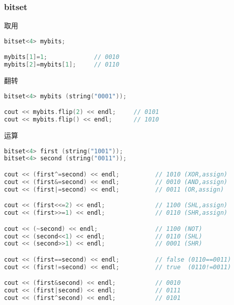     \subsubsection{bitset}
	取用\\
	\begin{lstlisting}[language=c++]
bitset<4> mybits;

mybits[1]=1;             // 0010
mybits[2]=mybits[1];     // 0110
	\end{lstlisting}
	翻转\\
	\begin{lstlisting}[language=c++]
bitset<4> mybits (string("0001"));

cout << mybits.flip(2) << endl;     // 0101
cout << mybits.flip() << endl;      // 1010
	\end{lstlisting}
	运算\\
	\begin{lstlisting}[language=c++]
bitset<4> first (string("1001"));
bitset<4> second (string("0011"));

cout << (first^=second) << endl;          // 1010 (XOR,assign)
cout << (first&=second) << endl;          // 0010 (AND,assign)
cout << (first|=second) << endl;          // 0011 (OR,assign)

cout << (first<<=2) << endl;              // 1100 (SHL,assign)
cout << (first>>=1) << endl;              // 0110 (SHR,assign)

cout << (~second) << endl;                // 1100 (NOT)
cout << (second<<1) << endl;              // 0110 (SHL)
cout << (second>>1) << endl;              // 0001 (SHR)

cout << (first==second) << endl;          // false (0110==0011)
cout << (first!=second) << endl;          // true  (0110!=0011)

cout << (first&second) << endl;           // 0010
cout << (first|second) << endl;           // 0111
cout << (first^second) << endl;           // 0101
	\end{lstlisting}
	
